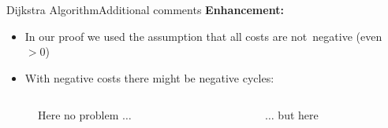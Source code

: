 
\begin{frame}{Dijkstra Algorithm}{Additional comments}
  \textbf{Enhancement:}
  \begin{itemize}
    \item
      In our proof we used the assumption that all costs are
      {\color{Mittel-Blau}not~negative} (even $> 0$)
    \item
      With {\color{Mittel-Blau}negative costs} there might be
      {\color{Mittel-Blau}negative cycles}:
  \end{itemize}
  \begin{columns}
    \begin{column}{0.4\linewidth}
      \begin{figure}[!h]
        \begin{adjustbox}{width=0.7\linewidth}
          
        \end{adjustbox}
        \caption{Here no problem $\ldots$}
      \end{figure}
    \end{column}
    \begin{column}{0.4\linewidth}
      \begin{figure}[!h]
        \begin{adjustbox}{width=0.7\linewidth}
          \def\DijkstraNegativeCycle{0}%
          
        \end{adjustbox}
        \caption{$\ldots$ but here}
      \end{figure}
    \end{column}
  \end{columns}
\end{frame}


